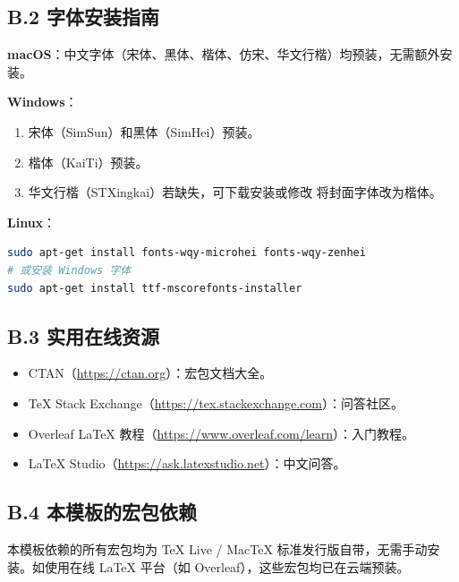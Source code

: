 \documentclass[../main-manual.tex]{subfiles}
\begin{document}
\subsection*{B.2 字体安装指南}

\textbf{macOS}：中文字体（宋体、黑体、楷体、仿宋、华文行楷）均预装，无需额外安装。

\textbf{Windows}：
\begin{enumerate}
	\item 宋体（SimSun）和黑体（SimHei）预装。
	\item 楷体（KaiTi）预装。
	\item 华文行楷（STXingkai）若缺失，可下载安装或修改  将封面字体改为楷体。
\end{enumerate}

\textbf{Linux}：
\begin{lstlisting}[language=bash, caption={Ubuntu/Debian 安装中文字体}]
sudo apt-get install fonts-wqy-microhei fonts-wqy-zenhei
# 或安装 Windows 字体
sudo apt-get install ttf-mscorefonts-installer
\end{lstlisting}

\subsection*{B.3 实用在线资源}

\begin{itemize}
	\item CTAN（\url{https://ctan.org}）：宏包文档大全。
	\item \TeX{} Stack Exchange（\url{https://tex.stackexchange.com}）：问答社区。
	\item Overleaf \LaTeX{} 教程（\url{https://www.overleaf.com/learn}）：入门教程。
	\item \LaTeX{} Studio（\url{https://ask.latexstudio.net}）：中文问答。
\end{itemize}

\subsection*{B.4 本模板的宏包依赖}

本模板依赖的所有宏包均为 \TeX{} Live / Mac\TeX{} 标准发行版自带，无需手动安装。如使用在线 \LaTeX{} 平台（如 Overleaf），这些宏包均已在云端预装。

\FloatBarrier
\clearpage
\begingroup
{}
\renewcommand{\bibname}{\heiti \zihao{4} 参考文献}

\endgroup
\end{document}
